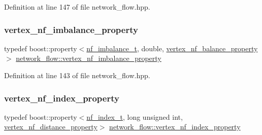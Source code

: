 Definition at line 147 of file network\+\_\+flow.\+hpp.

\mbox{\label{classnetwork__flow_a0a396ed01fb0e279605ea3be069c719f}} 
\subsubsection{\texorpdfstring{vertex\+\_\+nf\+\_\+imbalance\+\_\+property}{vertex\_nf\_imbalance\_property}}
{\footnotesize\ttfamily typedef boost\+::property$<$\hyperlink{structnetwork__flow_1_1nf__imbalance__t}{nf\+\_\+imbalance\+\_\+t}, double, \hyperlink{classnetwork__flow_a909dd9bc4e908f48724ce22b849b97e8}{vertex\+\_\+nf\+\_\+balance\+\_\+property}$>$ \hyperlink{classnetwork__flow_a0a396ed01fb0e279605ea3be069c719f}{network\+\_\+flow\+::vertex\+\_\+nf\+\_\+imbalance\+\_\+property}\hspace{0.3cm}{\ttfamily [private]}}



Definition at line 143 of file network\+\_\+flow.\+hpp.

\mbox{\label{classnetwork__flow_a5cf2b14797e4f8b5ef2e9a83d029497c}} 
\subsubsection{\texorpdfstring{vertex\+\_\+nf\+\_\+index\+\_\+property}{vertex\_nf\_index\_property}}
{\footnotesize\ttfamily typedef boost\+::property$<$\hyperlink{structnetwork__flow_1_1nf__index__t}{nf\+\_\+index\+\_\+t}, long unsigned int, \hyperlink{classnetwork__flow_a780d1139b4f0ab312b68f45134af86c5}{vertex\+\_\+nf\+\_\+distance\+\_\+property}$>$ \hyperlink{classnetwork__flow_a5cf2b14797e4f8b5ef2e9a83d029497c}{network\+\_\+flow\+::vertex\+\_\+nf\+\_\+index\+\_\+property}\hspace{0.3cm}{\ttfamily [private]}}



